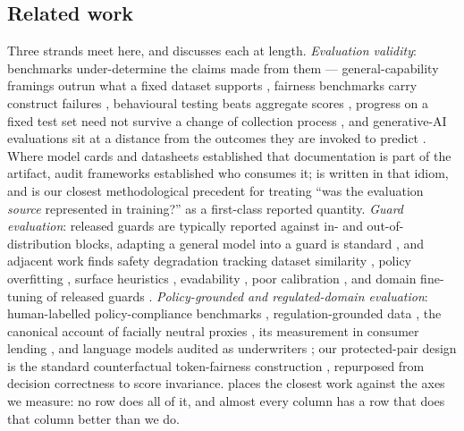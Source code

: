 \documentclass[manuscript,screen,review,anonymous]{acmart}
\begin{document}
\subsection{Related work}
\label{sec:related}

Three strands meet here, and  discusses each at length.
\emph{Evaluation validity}: benchmarks under-determine the claims made from them --- general-capability
framings outrun what a fixed dataset supports \citep{raji2021everything}, fairness benchmarks carry
construct failures \citep{blodgett2021salmon}, behavioural testing beats aggregate scores
\citep{bowman2021benchmarking,ribeiro2020checklist}, progress on a fixed test set need not survive a
change of collection process \citep{recht2019imagenet,taori2020measuring}, and generative-AI evaluations
sit at a distance from the outcomes they are invoked to predict
\citep{weidinger2023sociotechnical,solaiman2023socialimpact,liao2023sociotechnicalgap}. Where model
cards and datasheets \citep{mitchell2019modelcards,gebru2021datasheets,hutchinson2021accountability}
established that documentation is part of the artifact, audit frameworks
\citep{raji2020closing,metaxa2021auditing,raji2022outsider} established who consumes it;
 is written in that idiom, and \citet{kapoor2023leakage} is our closest
methodological precedent for treating ``was the evaluation \emph{source} represented in training?'' as a
first-class reported quantity. \emph{Guard evaluation}: released guards
\citep{inan2023llamaguard,han2024wildguard,zeng2024shieldgemma,padhi2024graniteguardian,qwen3guard2025}
are typically reported against in- and out-of-distribution blocks, adapting a general model into a guard
is standard \citep{elesedy2024loraguard}, and adjacent work finds safety degradation tracking dataset
similarity \citep{hsiung2025guardrails}, policy overfitting \citep{liu2026domaingeneralizable}, surface
heuristics \citep{li2026surfaceheuristics}, evadability
\citep{hackett2025bypassing,bassani2025robustness}, poor calibration \citep{liu2025calibration}, and
domain fine-tuning of released guards \citep{hossain2026safetygeometry,lee2025saferoute,achara2025watchdogs}.
\emph{Policy-grounded and regulated-domain evaluation}: human-labelled policy-compliance benchmarks
\citep{cisnerosvelarde2026policy,choi2026compass}, regulation-grounded data
\citep{zhao2026mlbenchguard}, the canonical account of facially neutral proxies
\citep{barocas2016disparate}, its measurement in consumer lending \citep{bartlett2022fintech}, and
language models audited as underwriters \citep{bowen2024mortgage}; our protected-pair design is the
standard counterfactual token-fairness construction
\citep{kusner2017counterfactual,garg2019counterfactual}, repurposed from decision correctness to score
invariance.  places the closest work against the axes we measure: no row does all of
it, and almost every column has a row that does that column better than we do.
\end{document}
